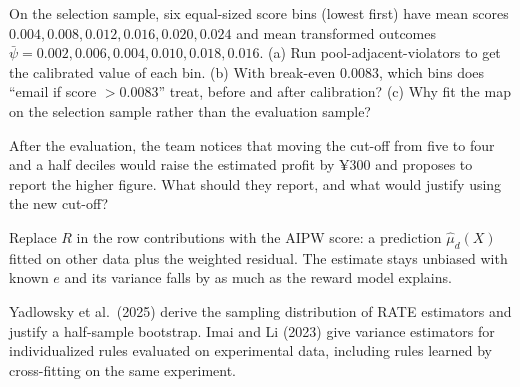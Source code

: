 \documentclass[11pt]{article}
\begin{document}
\begin{exercise}[computation]
On the selection sample, six equal-sized score bins (lowest first) have mean scores $0.004, 0.008, 0.012, 0.016, 0.020, 0.024$ and
mean transformed outcomes $\bar\psi = 0.002, 0.006, 0.004, 0.010, 0.018, 0.016$. (a) Run pool-adjacent-violators to get the
calibrated value of each bin. (b) With break-even $0.0083$, which bins does ``email if score $> 0.0083$'' treat, before and after
calibration? (c) Why fit the map on the selection sample rather than the evaluation sample?
\end{exercise}

\begin{exercise}[judgment]
After the evaluation, the team notices that moving the cut-off from five to four and a half deciles would raise the
estimated profit by ¥300 and proposes to report the higher figure. What should they report, and what would justify
using the new cut-off?
\end{exercise}

\sectionthree

\begin{extension}
Replace $R$ in the row contributions with the AIPW score: a prediction $\hat\mu_d(X)$ fitted on other data plus the weighted
residual. The estimate stays unbiased with known $e$ and its variance falls by as much as the reward model explains.
\end{extension}

\begin{extension}
Yadlowsky et al.\ (2025) derive the sampling distribution of RATE estimators and justify a half-sample bootstrap. Imai and Li
(2023) give variance estimators for individualized rules evaluated on experimental data, including rules learned by
cross-fitting on the same experiment.
\end{extension}
\end{document}
